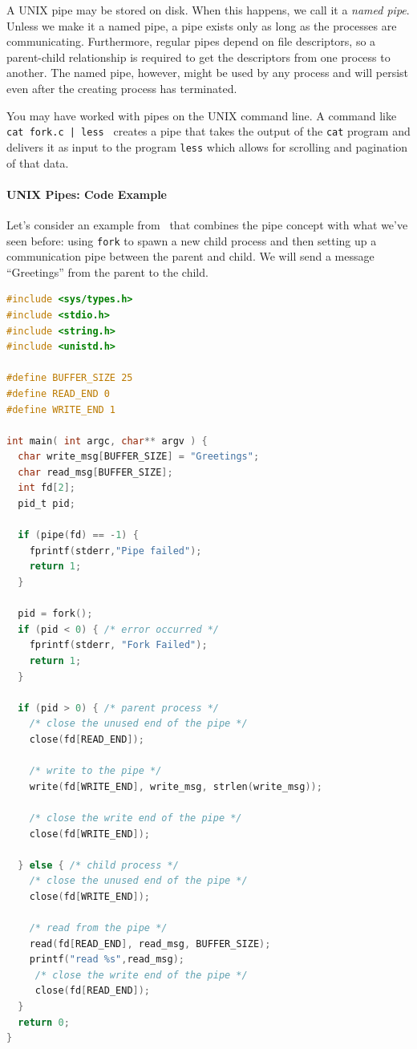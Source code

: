 A UNIX pipe may be stored on disk. When this happens, we call it a \textit{named pipe}. Unless we make it a named pipe, a pipe exists only as long as the processes are communicating. Furthermore, regular pipes depend on file descriptors, so a parent-child relationship is required to get the descriptors from one process to another. The named pipe, however, might be used by any process and will persist even after the creating process has terminated. %

You may have worked with pipes on the UNIX command line. A command like \texttt{ cat fork.c | less } creates a pipe that takes the output of the \texttt{cat} program and delivers it as input to the program \texttt{less} which allows for scrolling and pagination of that data.

\paragraph{UNIX Pipes: Code Example}

Let's consider an example from~\cite{osc} that combines the pipe concept with what we've seen before: using \texttt{fork} to spawn a new child process and then setting up a communication pipe between the parent and child. We will send a message ``Greetings'' from the parent to the child.

\begin{lstlisting}[language=C]
#include <sys/types.h> 
#include <stdio.h> 
#include <string.h> 
#include <unistd.h>

#define BUFFER_SIZE 25
#define READ_END 0 
#define WRITE_END 1

int main( int argc, char** argv ) {
  char write_msg[BUFFER_SIZE] = "Greetings"; 
  char read_msg[BUFFER_SIZE];
  int fd[2];
  pid_t pid;

  if (pipe(fd) == -1) {
    fprintf(stderr,"Pipe failed");
    return 1;
  }
  
  pid = fork();
  if (pid < 0) { /* error occurred */ 
    fprintf(stderr, "Fork Failed"); 
    return 1;
  }

  if (pid > 0) { /* parent process */
    /* close the unused end of the pipe */ 
    close(fd[READ_END]);
    
    /* write to the pipe */
    write(fd[WRITE_END], write_msg, strlen(write_msg));
    
    /* close the write end of the pipe */
    close(fd[WRITE_END]);
    
  } else { /* child process */
    /* close the unused end of the pipe */ 
    close(fd[WRITE_END]);
    
    /* read from the pipe */
    read(fd[READ_END], read_msg, BUFFER_SIZE); 
    printf("read %s",read_msg);
     /* close the write end of the pipe */
     close(fd[READ_END]);
  }
  return 0;
}
\end{lstlisting}

